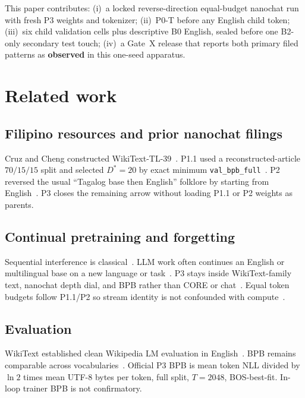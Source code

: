 \documentclass[11pt,a4paper]{article}
\begin{document}
This paper contributes: (i)~a locked reverse-direction equal-budget nanochat run with fresh P3 weights and tokenizer; (ii)~P0-T before any English child token; (iii)~six child validation cells plus descriptive B0 English, sealed before one B2-only secondary test touch; (iv)~a Gate~X release that reports both primary filed patterns as \textbf{observed} in this one-seed apparatus.

\section{Related work}
\label{sec:related}

\subsection{Filipino resources and prior nanochat filings}
Cruz and Cheng constructed WikiText-TL-39~\cite{cruz2019eval}. P1.1 used a reconstructed-article $70/15/15$ split and selected $D^*=20$ by exact minimum \texttt{val\_bpb\_full}~\cite{pajo2026p11,aspredicted306780}. P2 reversed the usual ``Tagalog base then English'' folklore by starting from English~\cite{pajo2026p2,aspredicted306935}. P3 closes the remaining arrow without loading P1.1 or P2 weights as parents.

\subsection{Continual pretraining and forgetting}
Sequential interference is classical~\cite{mccloskey1989catastrophic,french1999cf}. LLM work often continues an English or multilingual base on a new language or task~\cite{luo2023forgetting,ramasesh2021forgetscale,shi2024continual}. P3 stays inside WikiText-family text, nanochat depth dial, and BPB rather than CORE or chat~\cite{karpathy2026nanochat}. Equal token budgets follow P1.1/P2 so stream identity is not confounded with compute~\cite{kaplan2020scaling,hoffmann2022chinchilla,muennighoff2023dataconstrained}.

\subsection{Evaluation}
WikiText established clean Wikipedia LM evaluation in English~\cite{merity2017pointer}. BPB remains comparable across vocabularies~\cite{shannon1951prediction,brown2020gpt3}. Official P3 BPB is mean token NLL divided by $\ln 2$ times mean UTF-8 bytes per token, full split, $T=2048$, BOS-best-fit. In-loop trainer BPB is not confirmatory.
\end{document}
